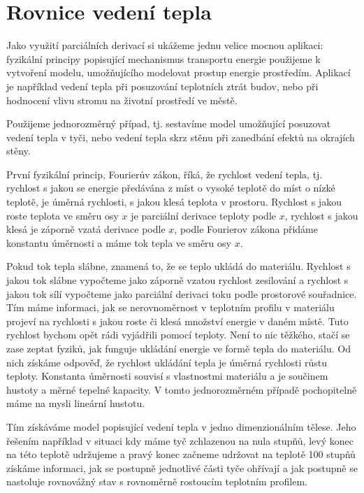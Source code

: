 \documentclass[12pt]{article}
\begin{document}
\newpage
\section*{Rovnice vedení tepla}


Jako využití parciálních derivací si ukážeme jednu velice mocnou aplikaci: fyzikální principy popisující mechanismus transportu energie použijeme k vytvoření modelu, umožňujícího modelovat prostup energie prostředím. Aplikací je například vedení tepla při posuzování teplotních ztrát budov, nebo při hodnocení vlivu stromu na životní prostředí ve městě.

Použijeme jednorozměrný případ, tj. sestavíme model umožňující posuzovat vedení tepla v tyči, nebo vedení tepla skrz stěnu při zanedbání efektů na okrajích stěny. 

První fyzikální princip, Fourierův zákon, říká, že rychlost vedení tepla, tj. rychlost s jakou se energie předávána z míst o vysoké teplotě do míst o nízké teplotě, je úměrná rychlosti, s jakou klesá teplota v prostoru. Rychlost s jakou roste teplota ve směru osy $x$ je parciální derivace teploty podle $x$, rychlost s jakou klesá je záporně vzatá derivace podle $x$, podle Fourierov zákona přidáme konstantu úměrnosti a máme tok tepla ve směru osy $x$.

Pokud tok tepla slábne, znamená to, že se teplo ukládá do materiálu. Rychlost s jakou tok slábne vypočteme jako záporně vzatou rychlost zesilování a rychlost s jakou tok sílí vypočteme jako parciální derivaci toku podle prostorové souřadnice. Tím máme informaci, jak se nerovnoměrnost v teplotním profilu v materiálu projeví na rychlosti s jakou roste či klesá množství energie v daném místě. Tuto rychlost bychom opět rádi vyjádřili pomocí teploty. Není to nic těžkého, stačí se zase zeptat fyziků, jak funguje ukládání energie ve formě tepla do materiálu. Od nich získáme odpověď, že rychlost ukládání tepla je úměrná rychlosti růstu teploty. Konstanta úměrnosti souvisí s vlastnostmi materiálu a je součinem hustoty a měrné tepelné kapacity. V tomto jednorozměrném případě pochopitelně máme na mysli lineární hustotu. 

Tím získáváme model popisující vedení tepla v jedno dimenzionálním tělese. Jeho řešením například v situaci kdy máme tyč zchlazenou na nula stupňů, levý konec na této teplotě udržujeme a pravý konec začneme udržovat na teplotě 100 stupňů získáme informaci, jak se postupně jednotlivé části tyče ohřívají a jak postupně se nastoluje rovnovážný stav s rovnoměrně rostoucím teplotním profilem.
\end{document}
